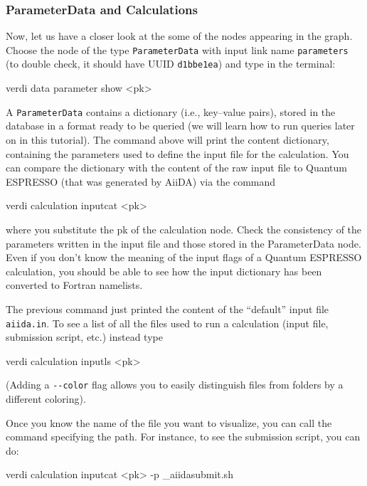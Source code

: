 \subsubsection*{ParameterData and Calculations}
Now, let us have a closer look at the some of the nodes appearing in the graph. 
Choose the node of the type \texttt{ParameterData} with input link name \texttt{parameters}
(to double check, it should have UUID \texttt{d1bbe1ea}) 
and type in the terminal:
\begin{bashcommand}
verdi data parameter show <pk>
\end{bashcommand}
A \texttt{ParameterData} contains a dictionary (i.e., key--value pairs), stored in the database in a format ready to be queried (we will learn how to run queries later on in this tutorial). The command above will print the content dictionary, containing the parameters used to define the input file for the calculation. You can compare the dictionary with the content of the raw input file to Quantum ESPRESSO (that was generated by AiiDA) via the command
\begin{bashcommand}
verdi calculation inputcat <pk>
\end{bashcommand}
where you substitute the pk of the calculation node. 
Check the consistency of the parameters written in the input file and those stored in the ParameterData node. Even if you don't know the meaning of the input flags of a Quantum ESPRESSO calculation, you should be able to see how the input dictionary
has been converted to Fortran namelists. 

The previous command just printed the content of the ``default'' input file \texttt{aiida.in}. 
To see a list of all the files used to run a calculation (input file, submission script, etc.) instead type
\begin{bashcommand}
verdi calculation inputls <pk>
\end{bashcommand}
(Adding a \texttt{-{}-color} flag allows you to easily distinguish files from folders by a different coloring).

Once you know the name of the file you want to visualize, you can call the  command specifying the path. For instance, to see the submission
script, you can do:
\begin{bashcommand}
verdi calculation inputcat <pk> -p _aiidasubmit.sh
\end{bashcommand}

